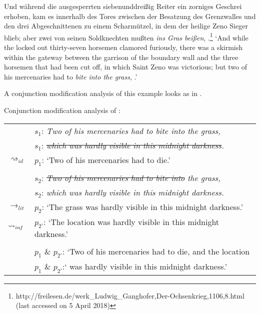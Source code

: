 \documentclass[output=paper]{langsci/langscibook}
\begin{document}
\ea \label{hardly visible grass}
Und während die ausgesperrten siebenunddreißig Reiter ein zorniges Ge\-schrei erhoben, kam es innerhalb des Tores zwischen der Besatzung des Grenzwalles und den drei Abgeschnittenen zu einem Scharmützel, in dem der heilige Zeno Sieger blieb; aber zwei von seinen Soldknechten mußten \textit{ins Gras beißen}, \underline{} \underline{}.\footnote{http://freilesen.de/werk\_Ludwig\_Ganghofer,Der-Ochsenkrieg,1106,8.html \\
(last accessed on 5 April 2018)}
\vspace{5pt}
\glt `And while the locked out thirty-seven horsemen clamored furiously, there was a skirmish within the gateway between the garrison of the boundary wall and the three horsemen that had been cut off, in which Saint Zeno was victorious; but two of his mercenaries had to \textit{bite into the grass}, \underline{}.'
\z

\noindent A conjunction modification analysis of this example looks as in .

\ea \label{analysis hardly visible grass} 
Conjunction modification analysis of : \\
\vspace{5pt}
\begin{tabular}{ll}
								& 	$s_{1}$: \hspace{4pt} \textit{Two of his mercenaries had to bite into the grass,} \\
								&	{\white $s_{1}$:} \hspace{4pt} \textit{\sout{which was hardly visible in this midnight darkness}.} \\
$\rightsquigarrow_{id}$				&	$p_{1}$: \hspace{1pt} `Two of his mercenaries had to die.' \\
\vspace{-5pt} \\
								& 	$s_{2}$: \hspace{4pt} \textit{\sout{Two of his mercenaries had to bite into} the grass,} \\
								&	{\white $s_{2}$:} \hspace{4pt} \textit{which was hardly visible in this midnight darkness.} \\
$\rightarrow_{lit}$					&	$p_{2}$: \hspace{1pt} `The grass was hardly visible in this midnight darkness.' \\
$\rightsquigarrow_{in\hspace{-0.8pt} f}$	&	$p_{2'}$: \hspace{-1.5pt} `The location was hardly visible in this midnight darkness.' \\
\vspace{-5pt} \\
								&	$p_{1}$ \& $p_{2'}$: `Two of his mercenaries had to die, and the location \\
								&	{\white $p_{1}$ \& $p_{2'}$:`} was hardly visible in this midnight darkness.'
\end{tabular}
\z
\end{document}
